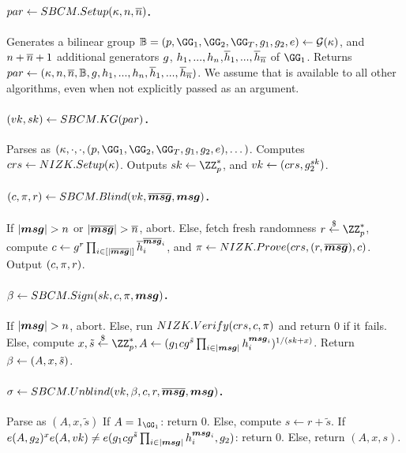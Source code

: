 \paragraph{$par \gets SBCM.Setup(\kappa,n,\overline{n})$.} %
Generates a bilinear group $\BB = (p,\GG_1,\GG_2,\GG_T,\gen{g}_1,\gen{g}_2,e)
\gets \PGen(\secpar)$, and $n+\overline{n}+1$ additional generators
$g$, $h_1,...,h_{n}$,$\overline{h}_1,...,\overline{h}_{\overline{n}}$
of $\GG_1$. Returns $par \gets (\kappa,n,\overline{n},\mathbb{B},
g,h_1,...,h_{n},\overline{h}_1,...,\overline{h}_{\overline{n}})$.
We assume that \parm is available to all other algorithms, even when not
explicitly passed as an argument.

\paragraph{$(vk,sk) \gets SBCM.KG(par)$.} %
Parses \parm as $(\secpar,\cdot,\cdot,(p,\GG_1,\GG_2,\GG_T,\gen{g}_1,\gen{g}_2,
e),\dots)$. Computes $crs \gets NIZK.Setup(\kappa)$. Outputs $\sk \gets
\ZZ^*_p$, and $vk \gets (crs,g_2^{sk})$.

\paragraph{$(c,\pi,r) \gets SBCM.Blind(vk,\overline{\boldsymbol{msg}},\boldsymbol{msg})$.} %
If $|\smsg |>\nattrs$ or $|\osmsg|>\tnattrs$,
abort. Else, fetch fresh randomness $r \getr \ZZ^*_p$, compute $c \gets
g^r\prod_{i \in [|\overline{\boldsymbol{msg}}|]}\overline{h}_i^{\overline{\boldsymbol{msg}}_i}$,
and $\pi \gets NIZK.Prove(crs,(r,\overline{\boldsymbol{msg}}),c)$.
Output $(c,\pi,r)$.

\paragraph{$\beta \gets SBCM.Sign(sk,c,\pi,\boldsymbol{msg})$.} %
If $|\smsg|>\nattrs$, abort. Else, run $NIZK.Verify(crs,c,\pi)$
and return $0$ if it fails. Else, compute $x,\tilde{s} \getr \ZZ^*_p, A \gets
(\gen{g}_1\Ccom \gen{g}^{\tilde{s}} \prod_{i \in |\smsg|}
\gen{h}_i^{\smsg_i})^{1/(\sk+x)}$. Return $\beta \gets (A,x,\tilde{s})$.

\paragraph{$\sigma \gets SBCM.Unblind(vk,\beta,c,r,
  \overline{\boldsymbol{msg}},\boldsymbol{msg})$.} %
Parse \bsig as $(A,x,\tilde{s})$
If $A = 1_{\GG_1}$: return $0$. Else, compute $s \gets r + \tilde{s}$. If
$e(A,g_2)^xe(A,vk) \neq e(g_1cg^{\tilde{s}}
\prod_{i \in |\boldsymbol{msg}|}h_i^{\boldsymbol{msg}_i},g_2)$: return $0$. Else, return
$(A,x,s)$.

